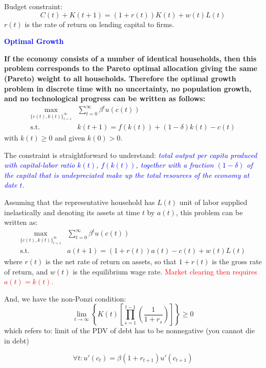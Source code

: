 Budget constraint:
\[ C(t) + K(t + 1) = (1 + r(t))K(t) + w(t)L(t) \]
$r(t)$ is the rate of return on lending capital to firms.

\begin{note}
\textbf{\textcolor{blue}{Optimal Growth}}

\textbf{If the economy consists of a number of identical households, then this problem corresponds to the Pareto optimal allocation giving the same (Pareto) weight to all households. Therefore the optimal growth problem in discrete time with no uncertainty, no population growth, and no technological progress can be written as follows:}
\begin{align*}
    \max_{\{c(t), k(t)\}_{t=1}^{\infty}} &\sum_{t = 0}^{\infty} \beta^t u(c(t)) \\
    \text{s.t.} \quad &k(t + 1) = f(k(t)) + (1 - \delta)k(t) - c(t)
\end{align*}
with $k(t) \geq 0$ and given $k(0) > 0$.

The constraint is straightforward to understand: \textit{\textcolor{blue}{total output per capita produced with capital-labor ratio $k(t)$, $f(k(t))$, together with a fraction $(1 - \delta)$ of the capital that is undepreciated make up the total resources of the economy at date $t$.}}

Assuming that the representative household has $L(t)$ unit of labor supplied inelastically and denoting its assets at time $t$ by $a(t)$, this problem can be written as:
\begin{align*}
    \max_{\{c(t), k(t)\}_{t=1}^{\infty}} &\sum_{t = 0}^{\infty} \beta^t u(c(t)) \\
    \text{s.t.} \quad &a(t + 1) = (1 + r(t))a(t) - c(t) + w(t)L(t)
\end{align*}
where $r(t)$ is the net rate of return on assets, so that $1 + r(t)$ is the gross rate of return, and $w(t)$ is the equilibrium wage rate. \textcolor{red}{Market clearing then requires $a(t) = k(t)$.}
\end{note}

And, we have the non-Ponzi condition:
\[ \lim_{t \to \infty} \left\{K(t)\left[\prod_{s = 1}^{t-1} \left(\frac{1}{1 + r_s}\right)\right]\right\} \geq 0 \]
which refers to: limit of the PDV of debt has to be nonnegative (you cannot die in debt)

\begin{theorem}
\[ \forall t : u'(c_t) = \beta(1 + r_{t + 1})u'(c_{t + 1}) \]
\end{theorem}

